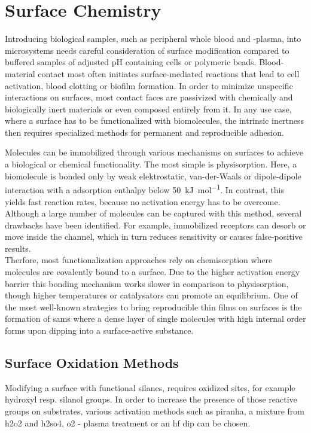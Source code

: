 \section{Surface Chemistry}
Introducing biological samples, such as peripheral whole blood and -plasma, into microsystems needs careful consideration of surface modification compared to buffered samples of adjusted pH containing cells or polymeric beads. Blood-material contact most often initiates surface-mediated reactions that lead to cell activation, blood clotting or biofilm formation. In order to minimize unspecific interactions on surfaces, most contact faces are passivized with chemically and biologically inert materials or even composed entirely from it. In any use case, where a surface has to be functionalized with biomolecules, the intrinsic inertness then requires specialized methods for permanent and reproducible adhesion.\cite{lit:chem:surface:methods}

Molecules can be immobilized through various mechanisms on surfaces to achieve a biological or chemical functionality. The most simple is physisorption. Here, a biomolecule is bonded only by weak elektrostatic, van-der-Waals or dipole-dipole interaction with a adsorption enthalpy below \SI{50}{\kilo\joule\per\mole}. In contrast, this yields fast reaction rates, because no activation energy has to be overcome. Although a large number of molecules can be captured with this method, several drawbacks have been identified. \cite{lit:bio:ImmobilizationTechniques, lit:bio:immobilization:UV-ABs}
For example, immobilized receptors can desorb or move inside the channel, which in turn reduces sensitivity or causes false-positive results. \cite{lit:bio:physisorp:desorption, lit:chem:surfModOptics} \\
Therfore, most functionalization approaches rely on chemisorption where molecules are covalently bound to a surface. Due to the higher activation energy barrier this bonding mechanism works slower in comparison to physisorption, though higher temperatures or catalysators can promote an equilibrium. One of the most well-known strategies to bring reproducible thin films on surfaces is the formation of \glspl{sam} where a dense layer of single molecules with high internal order forms upon dipping into a surface-active substance. \cite{lit:chem:sin:langeDiss}

\subsection{Surface Oxidation Methods}
Modifying a surface with functional silanes, requires oxidized sites, for example \gls{hydroxyl} resp. \gls{silanol} groups. In order to increase the presence of those reactive groups on substrates, various activation methods such as piranha, a mixture from \gls{h2o2} and \gls{h2so4}, \gls{o2} - plasma treatment or an \gls{hf} dip can be chosen. \cite{lit:chem:sin:etchingandchemical} 

